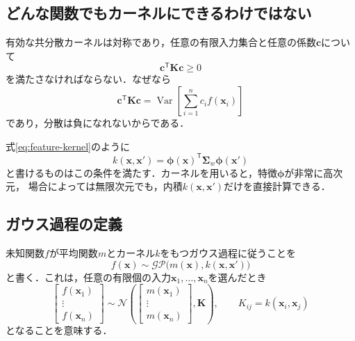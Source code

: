 \documentclass[a4paper,11pt]{ltjsarticle}
\newcommand{\N}{\mathcal N}
\newcommand{\GP}{\mathcal{GP}}
\newcommand{\T}{\mathsf T}
\newcommand{\Var}{\operatorname{Var}}
\begin{document}
\subsection{どんな関数でもカーネルにできるわけではない}

有効な共分散カーネルは対称であり，任意の有限入力集合と任意の係数\(\bm c\)について
\begin{equation}
  \bm c^\T\bm K\bm c\geq0
  \label{eq:kernel-psd-condition}
\end{equation}
を満たさなければならない．なぜなら
\begin{equation}
  \bm c^\T\bm K\bm c
  =\Var\left[\sum_{i=1}^n c_i f(\bm x_i)\right]
\end{equation}
であり，分散は負になれないからである．

式\eqref{eq:feature-kernel}のように
\begin{equation}
  k(\bm x,\bm x')
  =\bm\phi(\bm x)^\T\bm\Sigma_w\bm\phi(\bm x')
\end{equation}
と書けるものはこの条件を満たす．カーネルを用いると，特徴\(\bm\phi\)が非常に高次元，
場合によっては無限次元でも，内積\(k(\bm x,\bm x')\)だけを直接計算できる．

\subsection{ガウス過程の定義}

\begin{definitionbox}[ガウス過程]
未知関数\(f\)が平均関数\(m\)とカーネル\(k\)をもつガウス過程に従うことを
\begin{equation}
  f(\bm x)\sim\GP\bigl(m(\bm x),k(\bm x,\bm x')\bigr)
  \label{eq:gp-definition-symbol}
\end{equation}
と書く．これは，任意の有限個の入力\(\bm x_1,\ldots,\bm x_n\)を選んだとき
\begin{equation}
  \begin{bmatrix}
    f(\bm x_1)\\\vdots\\f(\bm x_n)
  \end{bmatrix}
  \sim\N\left(
  \begin{bmatrix}
    m(\bm x_1)\\\vdots\\m(\bm x_n)
  \end{bmatrix},
  \bm K
  \right),
  \qquad K_{ij}=k(\bm x_i,\bm x_j)
  \label{eq:gp-finite-definition}
\end{equation}
となることを意味する．
\end{definitionbox}
\end{document}

